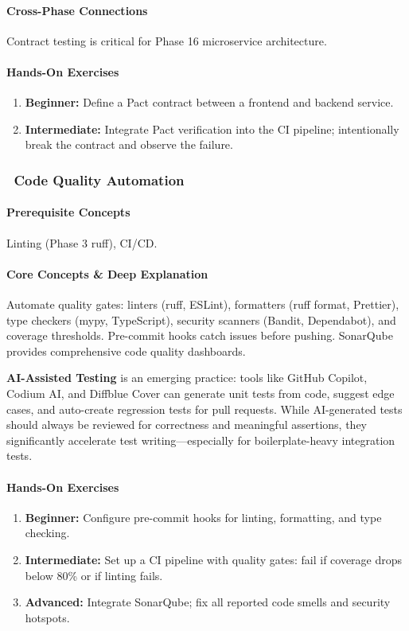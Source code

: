 \documentclass[11pt, a4paper, oneside]{report}
\newcommand{\mustmaster}[1]{\subsubsection{\texorpdfstring{\fcolorbox{blue!40!black}{blue!8}{\footnotesize\bfseries\color{blue!40!black} MUST MASTER}~#1}{#1}}}
\begin{document}
\paragraph{Cross-Phase Connections} Contract testing is critical for Phase 16 microservice architecture.

\paragraph{Hands-On Exercises}
\begin{enumerate}[leftmargin=*]
\item \textbf{Beginner:} Define a Pact contract between a frontend and backend service.
\item \textbf{Intermediate:} Integrate Pact verification into the CI pipeline; intentionally break the contract and observe the failure.
\end{enumerate}

\mustmaster{Code Quality Automation}

\paragraph{Prerequisite Concepts} Linting (Phase 3 ruff), CI/CD.

\paragraph{Core Concepts \& Deep Explanation} Automate quality gates: linters (ruff, ESLint), formatters (ruff format, Prettier), type checkers (mypy, TypeScript), security scanners (Bandit, Dependabot), and coverage thresholds. Pre-commit hooks catch issues before pushing. SonarQube provides comprehensive code quality dashboards.

\textbf{AI-Assisted Testing} is an emerging practice: tools like GitHub Copilot, Codium AI, and Diffblue Cover can generate unit tests from code, suggest edge cases, and auto-create regression tests for pull requests. While AI-generated tests should always be reviewed for correctness and meaningful assertions, they significantly accelerate test writing---especially for boilerplate-heavy integration tests.

\paragraph{Hands-On Exercises}
\begin{enumerate}[leftmargin=*]
\item \textbf{Beginner:} Configure pre-commit hooks for linting, formatting, and type checking.
\item \textbf{Intermediate:} Set up a CI pipeline with quality gates: fail if coverage drops below 80\% or if linting fails.
\item \textbf{Advanced:} Integrate SonarQube; fix all reported code smells and security hotspots.
\end{enumerate}
\end{document}
